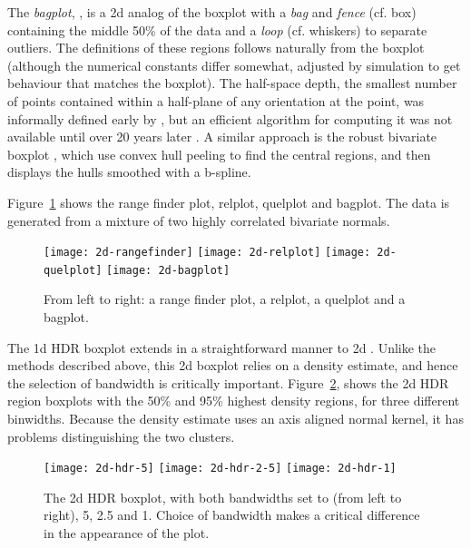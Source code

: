 \documentclass[oneside]{article}
\begin{document}
The \emph{bagplot}, \citep{Rousseeuw1999}, is a 2d analog of the boxplot with a \emph{bag} and \emph{fence} (cf. box) containing the middle 50\% of the data and a \emph{loop} (cf. whiskers) to separate outliers. The definitions of these regions follows naturally from the boxplot (although the numerical constants differ somewhat, adjusted by simulation to get behaviour that matches the boxplot). The half-space depth, the smallest number of points contained within a half-plane of any orientation at the point, was informally defined early by \citet{tukey:1975}, but an efficient algorithm for computing it was not available until over 20 years later \citep{rousseeuw:1996}.  A similar approach is the robust bivariate boxplot \citep{zani:1998}, which use convex hull peeling to find the central regions, and then displays the hulls smoothed with a b-spline.

Figure~\ref{fig:2d} shows the range finder plot, relplot, quelplot and bagplot. The data is generated from a mixture of two highly correlated bivariate normals.

\begin{figure}[htbp]
  \centering
  \texttt{[image: 2d-rangefinder]}%
  \texttt{[image: 2d-relplot]}%
  \texttt{[image: 2d-quelplot]}%
  \texttt{[image: 2d-bagplot]}
  \caption{From left to right: a range finder plot, a relplot, a quelplot and a bagplot.}
  \label{fig:2d}
\end{figure}

The 1d HDR boxplot extends in a straightforward manner to 2d \citep{hyndman:1996a}. Unlike the methods described above, this 2d boxplot relies on a density estimate, and hence the selection of bandwidth is critically important. Figure~\ref{fig:2d-hdr}, shows the 2d HDR region boxplots with the 50\% and 95\% highest density regions, for three different binwidths. Because the density estimate uses an axis aligned normal kernel, it has problems distinguishing the two clusters.

\begin{figure}[htbp]
  \centering
  \texttt{[image: 2d-hdr-5]}%
  \texttt{[image: 2d-hdr-2-5]}%
  \texttt{[image: 2d-hdr-1]}
  \caption{The 2d HDR boxplot, with both bandwidths set to (from left to right), 5, 2.5 and 1. Choice of bandwidth makes a critical difference in the appearance of the plot.}
  \label{fig:2d-hdr}
\end{figure}
\end{document}
